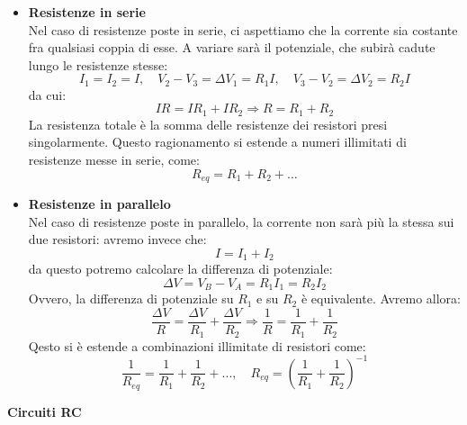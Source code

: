 \documentclass[a4paper,12pt]{article}
\begin{document}
\begin{itemize}
  \item \textbf{Resistenze in serie} \\
    Nel caso di resistenze poste in serie, ci aspettiamo che la corrente sia costante fra qualsiasi coppia di esse. A variare sarà il potenziale, che subirà cadute lungo le resistenze stesse:
    $$ I_1 = I_2 = I, \quad V_2 - V_3 = \Delta V_1 = R_1I, \quad V_3 - V_2 = \Delta V_2 = R_2I $$
    da cui:
    $$ IR = IR_1 + IR_2 \Rightarrow R = R_1 + R_2 $$
    La resistenza totale è la somma delle resistenze dei resistori presi singolarmente. Questo ragionamento si estende a numeri illimitati di resistenze messe in serie, come:
    $$ R_{eq} = R_1 + R_2 +... $$
  \item \textbf{Resistenze in parallelo} \\
    Nel caso di resistenze poste in parallelo, la corrente non sarà più la stessa sui due resistori: avremo invece che:
    $$ I = I_1 + I_2 $$
    da questo potremo calcolare la differenza di potenziale:
    $$ \Delta V = V_B - V_A = R_1 I_1 = R_2 I_2 $$
    Ovvero, la differenza di potenziale su $R_1$ e su $R_2$ è equivalente. Avremo allora:
    $$ \frac{\Delta V}{R} = \frac{\Delta V}{R_1} + \frac{\Delta V}{R_2} \Rightarrow \frac{1}{R} = \frac{1}{R_1} + \frac{1}{R_2} $$
    Qesto si è estende a combinazioni illimitate di resistori come:
    $$ \frac{1}{R_{eq}} = \frac{1}{R_1} + \frac{1}{R_2} + ... , \quad R_{eq} = \left( \frac{1}{R_1} + \frac{1}{R_2} \right)^{-1} $$
\end{itemize} 
\par\smallskip
\textbf{Circuiti RC} \\
\end{document}
